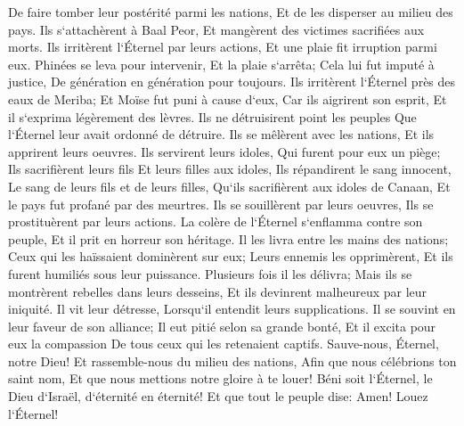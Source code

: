 \verse De faire tomber leur postérité parmi les nations, Et de les disperser au milieu des pays. 
\verse Ils s`attachèrent à Baal Peor, Et mangèrent des victimes sacrifiées aux morts. 
\verse Ils irritèrent l`Éternel par leurs actions, Et une plaie fit irruption parmi eux. 
\verse Phinées se leva pour intervenir, Et la plaie s`arrêta; 
\verse Cela lui fut imputé à justice, De génération en génération pour toujours. 
\verse Ils irritèrent l`Éternel près des eaux de Meriba; Et Moïse fut puni à cause d`eux, 
\verse Car ils aigrirent son esprit, Et il s`exprima légèrement des lèvres. 
\verse Ils ne détruisirent point les peuples Que l`Éternel leur avait ordonné de détruire. 
\verse Ils se mêlèrent avec les nations, Et ils apprirent leurs oeuvres. 
\verse Ils servirent leurs idoles, Qui furent pour eux un piège; 
\verse Ils sacrifièrent leurs fils Et leurs filles aux idoles, 
\verse Ils répandirent le sang innocent, Le sang de leurs fils et de leurs filles, Qu`ils sacrifièrent aux idoles de Canaan, Et le pays fut profané par des meurtres. 
\verse Ils se souillèrent par leurs oeuvres, Ils se prostituèrent par leurs actions. 
\verse La colère de l`Éternel s`enflamma contre son peuple, Et il prit en horreur son héritage. 
\verse Il les livra entre les mains des nations; Ceux qui les haïssaient dominèrent sur eux; 
\verse Leurs ennemis les opprimèrent, Et ils furent humiliés sous leur puissance. 
\verse Plusieurs fois il les délivra; Mais ils se montrèrent rebelles dans leurs desseins, Et ils devinrent malheureux par leur iniquité. 
\verse Il vit leur détresse, Lorsqu`il entendit leurs supplications. 
\verse Il se souvint en leur faveur de son alliance; 
\verse Il eut pitié selon sa grande bonté, Et il excita pour eux la compassion De tous ceux qui les retenaient captifs. 
\verse Sauve-nous, Éternel, notre Dieu! Et rassemble-nous du milieu des nations, Afin que nous célébrions ton saint nom, Et que nous mettions notre gloire à te louer! 
\verse Béni soit l`Éternel, le Dieu d`Israël, d`éternité en éternité! Et que tout le peuple dise: Amen! Louez l`Éternel! 

